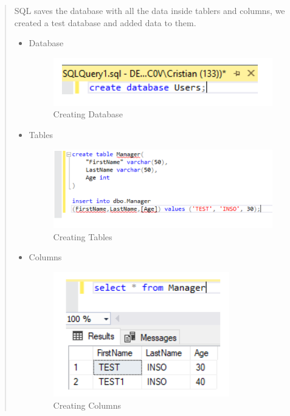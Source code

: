 \documentclass{article}
\begin{document}
\begin{quote}
    SQL saves the database with all the data inside tablers and columns, we created a test database and added data to them.
    \begin{itemize}
      \item Database

      \begin{figure}[h!]
          \centering
          \includegraphics[scale=0.5]{Images/createDatabase.png}
          \caption{Creating Database}
          \label{fig:figure 11}
      \end{figure}


      \item Tables

      \begin{figure}[h!]
          \centering
          \includegraphics[scale=0.5]{Images/createTables.png}
          \caption{Creating Tables}
          \label{fig:figure 12}
      \end{figure}

      \item Columns
      \begin{figure}[h!]
          \centering
          \includegraphics[scale=0.5]{Images/createColumns.png}
          \caption{Creating Columns}
          \label{fig:figure 13}
      \end{figure}


\end{itemize}
\end{quote}
\end{document}

